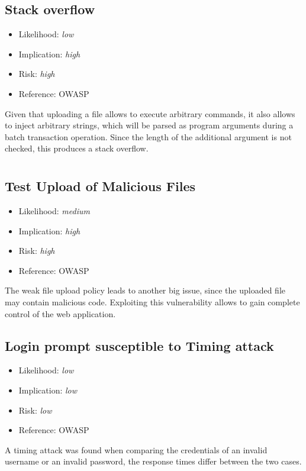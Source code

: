 \subsection{Stack overflow} \label{over:stack}
\begin{itemize}
	\item Likelihood: \textit{low}
	\item Implication: \textit{high}
	\item Risk: \textit{high}
	\item Reference: OWASP 
\end{itemize}
Given that uploading a file allows to execute arbitrary commands, it also allows to inject arbitrary strings, which will be parsed as program arguments during a batch transaction operation. Since the length of the additional argument is not checked, this produces a stack overflow.

\section{\gnb}
\subsection{Test Upload of Malicious Files} \label{over:maliciousgnb}
\begin{itemize}
	\item Likelihood: \textit{medium}
	\item Implication: \textit{high}
	\item Risk: \textit{high}
	\item Reference: OWASP 
\end{itemize}
The weak file upload policy leads to another big issue, since the uploaded file may contain malicious code. Exploiting this vulnerability allows to gain complete control of the web application.

\subsection{Login prompt susceptible to Timing attack} \label{over:timeattack}
\begin{itemize}
	\item Likelihood: \textit{low}
	\item Implication: \textit{low}
	\item Risk: \textit{low}
	\item Reference: OWASP 
\end{itemize}
A timing attack was found when comparing the credentials of an invalid username or an invalid password, the response times differ between the two cases.

